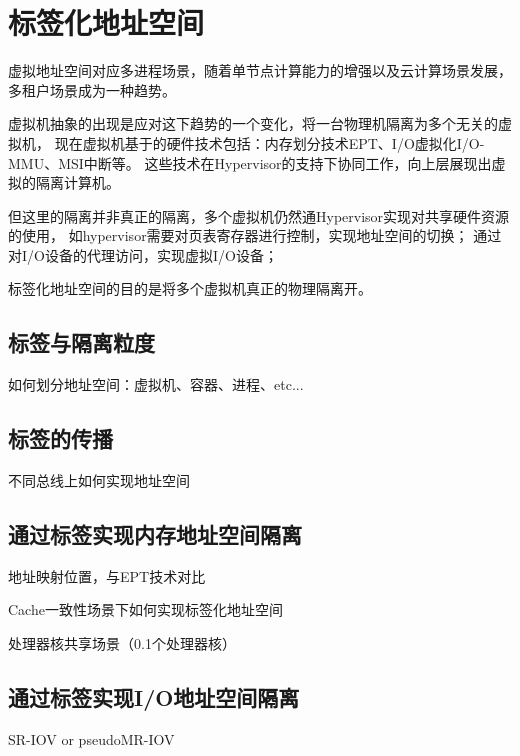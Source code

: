 

\chapter{标签化地址空间}
\label{chap:labeladdrspace}

虚拟地址空间对应多进程场景，随着单节点计算能力的增强以及云计算场景发展，
多租户场景成为一种趋势。

虚拟机抽象的出现是应对这下趋势的一个变化，将一台物理机隔离为多个无关的虚拟机，
现在虚拟机基于的硬件技术包括：内存划分技术EPT、I/O虚拟化I/O-MMU、MSI中断等。
这些技术在Hypervisor的支持下协同工作，向上层展现出虚拟的隔离计算机。

但这里的隔离并非真正的隔离，多个虚拟机仍然通Hypervisor实现对共享硬件资源的使用，
如hypervisor需要对页表寄存器进行控制，实现地址空间的切换；
通过对I/O设备的代理访问，实现虚拟I/O设备；

标签化地址空间的目的是将多个虚拟机真正的物理隔离开。



\section{标签与隔离粒度}

如何划分地址空间：虚拟机、容器、进程、etc...

\section{标签的传播}

不同总线上如何实现地址空间

\section{通过标签实现内存地址空间隔离}

地址映射位置，与EPT技术对比

Cache一致性场景下如何实现标签化地址空间

处理器核共享场景（0.1个处理器核）

\section{通过标签实现I/O地址空间隔离}

SR-IOV or pseudoMR-IOV

